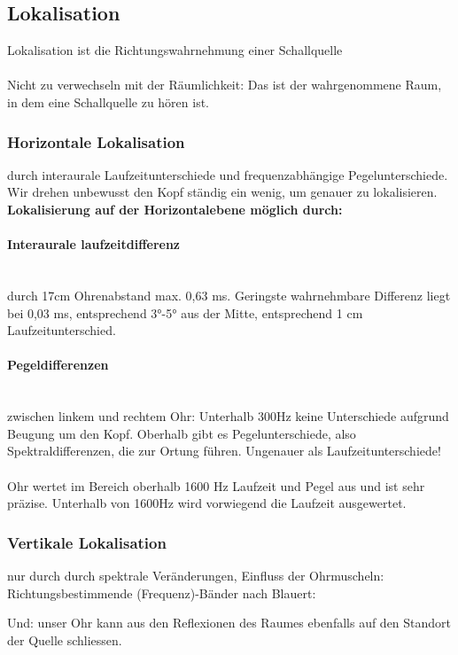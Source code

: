 \subsection{Lokalisation}
Lokalisation ist die Richtungswahrnehmung einer Schallquelle\\~\\
Nicht zu verwechseln mit der Räumlichkeit: Das ist der wahrgenommene Raum, in dem eine Schallquelle zu hören ist.

\subsubsection{Horizontale Lokalisation}
durch interaurale Laufzeitunterschiede und frequenzabhängige Pegelunterschiede. Wir drehen unbewusst den Kopf ständig ein wenig, um genauer zu lokalisieren.\\

\textbf{Lokalisierung auf der Horizontalebene möglich durch:}\\
\paragraph{Interaurale laufzeitdifferenz}~\\
durch 17cm Ohrenabstand max. 0,63 ms. Geringste wahrnehmbare Differenz liegt bei 0,03 ms, entsprechend 3°-5° aus der Mitte, entsprechend 1 cm Laufzeitunterschied.
\paragraph{Pegeldifferenzen}~\\
zwischen linkem und rechtem Ohr: Unterhalb 300Hz keine Unterschiede aufgrund Beugung um den Kopf. Oberhalb gibt es Pegelunterschiede, also Spektraldifferenzen, die zur Ortung führen. Ungenauer als Laufzeitunterschiede!\\~\\
Ohr wertet im Bereich oberhalb 1600 Hz Laufzeit und Pegel aus und ist sehr präzise. Unterhalb von 1600Hz wird vorwiegend die Laufzeit ausgewertet.

\subsubsection{Vertikale Lokalisation}
nur durch durch spektrale Veränderungen, Einfluss der Ohrmuscheln: Richtungsbestimmende (Frequenz)-Bänder nach Blauert:

Und: unser Ohr kann aus den Reflexionen des Raumes ebenfalls auf den Standort der Quelle schliessen.